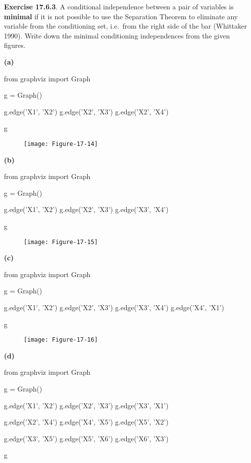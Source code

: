 \textbf{Exercise 17.6.3}. A conditional independence between a pair of
variables is \textbf{minimal} if it is not possible to use the
Separation Theorem to eliminate any variable from the conditioning set,
i.e.~from the right side of the bar (Whittaker 1990). Write down the
minimal conditioning independences from the given figures.

\textbf{(a)}

\begin{python}
from graphviz import Graph

g = Graph()

g.edge('X1', 'X2')
g.edge('X2', 'X3')
g.edge('X2', 'X4')

g
\end{python}

\begin{figure}[H]
\texttt{[image: Figure-17-14]}
\end{figure}

\textbf{(b)}

\begin{python}
from graphviz import Graph

g = Graph()

g.edge('X1', 'X2')
g.edge('X2', 'X3')
g.edge('X3', 'X4')

g
\end{python}
 
\begin{figure}[H]
\texttt{[image: Figure-17-15]}
\end{figure}

\textbf{(c)}

\begin{python}
from graphviz import Graph

g = Graph()

g.edge('X1', 'X2')
g.edge('X2', 'X3')
g.edge('X3', 'X4')
g.edge('X4', 'X1')

g
\end{python}

\begin{figure}[H]
\texttt{[image: Figure-17-16]}
\end{figure}

\textbf{(d)}

\begin{python}
from graphviz import Graph

g = Graph()

g.edge('X1', 'X2')
g.edge('X2', 'X3')
g.edge('X3', 'X1')

g.edge('X2', 'X4')
g.edge('X4', 'X5')
g.edge('X5', 'X2')

g.edge('X3', 'X5')
g.edge('X5', 'X6')
g.edge('X6', 'X3')

g
\end{python}


